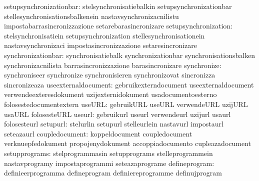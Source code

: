          setupsynchronizationbar: stelsynchronisatiebalkin         setupsynchronizationbar
                                  stellesynchronisationsbalkenein  nastavsynchronizacnilistu
                                  impostabarrasincronizzazione     setarebarasincronizare
            setupsynchronization: stelsynchronisatiein             setupsynchronization
                                  stellesynchronisationein         nastavsynchronizaci
                                  impostasincronizzazione          setaresincronizare
              synchronizationbar: synchronisatiebalk               synchronizationbar
                                  synchronisationsbalken           synchronizacnilista
                                  barrasincronizzazione            barasincronizare
                     synchronize: synchroniseer                    synchronize
                                  synchronisieren                  synchronizovat
                                  sincronizza                      sincronizeaza
             useexternaldocument: gebruikexterndocument            useexternaldocument
                                  verwendeexteresdokument          uzijexternidokument
                                  usadocumentoesterno              folosestedocumentextern
                          useURL: gebruikURL                       useURL
                                  verwendeURL                      uzijURL
                                  usaURL                           folosesteURL
                          useurl: gebruikurl                       useurl
                                  verwendeurl                      uzijurl
                                  usaurl                           folosesteurl
                        setupurl: stelurlin                        setupurl
                                  stelleurlein                     nastavurl
                                  impostaurl                       seteazaurl
                  coupledocument: koppeldocument                   coupledocument
                                  verknuepfedokument               propojenydokument
                                  accoppiadocumento                cupleazadocument
                   setupprograms: stelprogrammasin                 setupprograms
                                  stelleprogrammein                nastavprogramy
                                  impostaprogrammi                 seteazaprograme
                   defineprogram: definieerprogramma               defineprogram
                                  definiereprogramme               definujprogram
